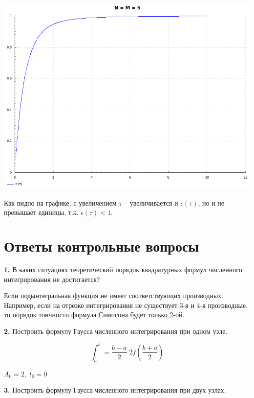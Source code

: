 \documentclass[a4paper,12pt]{article}
\begin{document}
\begin{center}
	\includegraphics[scale=0.5]{../../src/graph.png} \newline
\end{center}

\noindent Как видно на графике, с увеличением $\tau$ -- увеличивается и $\epsilon(\tau)$, но и не превышает единицы, т.к. $\epsilon(\tau) < 1$.

\section{Ответы контрольные вопросы}
\noindent\textbf{1.} В каких ситуациях теоретический порядок квадратурных формул численного интегрирования не достигается?\newline

\noindent Если подынтегральная функция не имеет соответствующих производных. Например, если на отрезке интегрирования не существует 3-я и 4-я производные, то порядок тончности формула Симпсона будет только 2-ой.\newline


\noindent\textbf{2.} Построить формулу Гаусса численного интегрирования при одном узле.\newline

$$ \int_{a}^{b} = \frac{b - a}{2} \; 2f(\frac{b + a}{2})$$

\noindent $A_{0} = 2, \; t_{0} = 0$

\noindent\textbf{3.} Построить формулу Гаусса численного интегрирования при двух узлах.\newline
\end{document}

